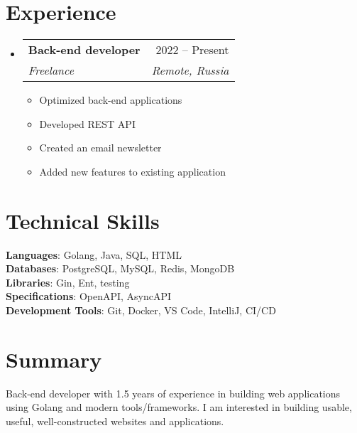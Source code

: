 \documentclass[letterpaper,11pt]{article}
\makeatletter
\newcommand{\resumeItem}[1]{
  \item\small{
    {#1 \vspace{-2pt}}
  }
}
\newcommand{\resumeSubheading}[4]{
  \vspace{-2pt}\item
    \begin{tabular*}{0.97\textwidth}[t]{l@{\extracolsep{\fill}}r}
      \textbf{#1} & #2 \\
      \textit{\small#3} & \textit{\small #4} \\
    \end{tabular*}\vspace{-7pt}
}
\newcommand{\resumeSubHeadingListStart}{\begin{itemize}[leftmargin=0.15in, label={}]}
\newcommand{\resumeSubHeadingListEnd}{\end{itemize}}
\newcommand{\resumeItemListStart}{\begin{itemize}}
\newcommand{\resumeItemListEnd}{\end{itemize}\vspace{-5pt}}
\makeatother
\begin{document}
\section{Experience}
\resumeSubHeadingListStart

\resumeSubheading
{Back-end developer\emph{}}{2022 -- Present}
{Freelance}{Remote, Russia}
\resumeItemListStart
\resumeItem{Optimized back-end applications}
\resumeItem{Developed REST API}
\resumeItem{Created an email newsletter}
\resumeItem{Added new features to existing application}
\resumeItemListEnd

\resumeSubHeadingListEnd

\section{Technical Skills}
\begin{itemize}[leftmargin=0.15in, label={}]
	\small{\item{
		\textbf{Languages}{: Golang, Java, SQL, HTML} \\
		\textbf{Databases}{: PostgreSQL, MySQL, Redis, MongoDB} \\
		\textbf{Libraries}{: Gin, Ent, testing} \\
		\textbf{Specifications}{: OpenAPI, AsyncAPI} \\
		\textbf{Development Tools}{: Git, Docker, VS Code, IntelliJ, CI/CD} \\
	}}
\end{itemize}

\section{Summary}
\begin{itemize}[leftmargin=0.15in, label={}]
\small{\item{Back-end developer with 1.5 years of experience in building web applications using Golang and modern tools/frameworks. I am interested in building usable, useful, well-constructed websites and applications. } \
}
\end{itemize}

\end{document}
